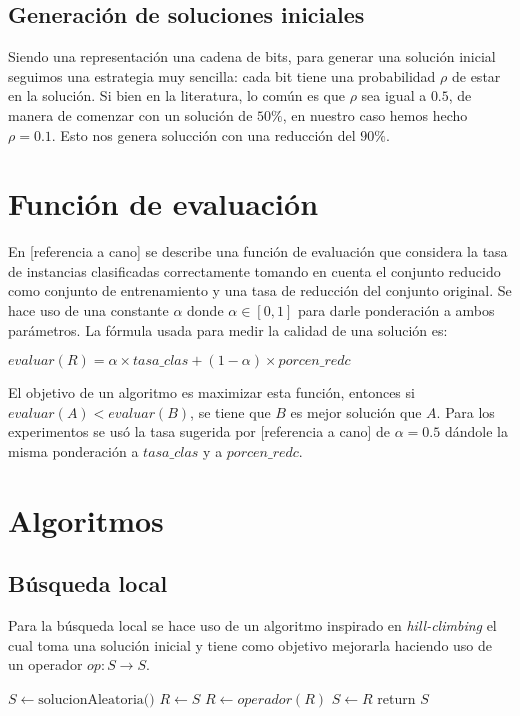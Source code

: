 \documentclass[11pt]{article}
\begin{document}
\subsection{Generación de soluciones iniciales}

Siendo una representación una cadena de bits, para generar una solución
inicial seguimos una estrategia muy sencilla: cada bit tiene una probabilidad $\rho$
de estar en la solución. Si bien en la literatura, lo común es
que $\rho$ sea igual a $0.5$, de manera de comenzar con un solución
de $50\%$, en nuestro caso hemos hecho $\rho = 0.1$. Esto nos genera
solucción con una reducción del $90\%$.

\section{Función de evaluación}
En [referencia a cano] se describe una función de evaluación que considera la tasa de instancias clasificadas correctamente tomando en cuenta el conjunto reducido como conjunto de entrenamiento y una tasa de reducción del conjunto original. Se hace uso de una constante $\alpha$ donde $\alpha \in [0,1]$ para darle ponderación a ambos parámetros. La fórmula usada para medir la calidad de una solución es:

\begin{center}
    $ evaluar(R) = \alpha \times tasa\_clas + (1 - \alpha) \times porcen\_redc $
\end{center}

El objetivo de un algoritmo es maximizar esta función, entonces si $evaluar(A) < evaluar(B)$, se tiene que $B$ es mejor solución que $A$. Para los experimentos se usó la tasa sugerida por [referencia a cano] de $\alpha = 0.5$ dándole la misma ponderación a $tasa\_clas$ y a $porcen\_redc$.

\section{Algoritmos}

\subsection{Búsqueda local}
    Para la búsqueda local se hace uso de un algoritmo inspirado en \emph{hill-climbing} el cual toma una solución inicial y tiene como objetivo mejorarla haciendo uso de un operador $op: S \to S$.

    \begin{algorithmic}
            \State $S \gets \text{solucionAleatoria()}$
                \State $R \gets S$
                \State $R \gets operador(R)$
                    \State $S \gets R$
                \EndIf
            \EndWhile
            \State return $S$
        \EndFunction
    \end{algorithmic}
\end{document}

